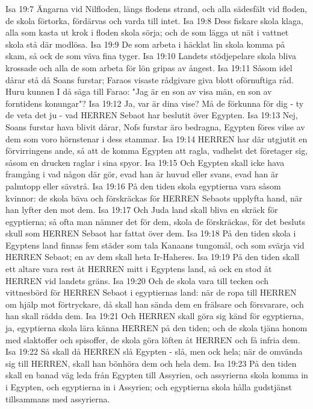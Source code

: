 Isa 19:7  Ängarna vid Nilfloden, längs flodens strand, och alla sädesfält vid floden, de skola förtorka, fördärvas och varda till intet.
Isa 19:8  Dess fiskare skola klaga, alla som kasta ut krok i floden skola sörja; och de som lägga ut nät i vattnet skola stå där modlösa.
Isa 19:9  De som arbeta i häcklat lin skola komma på skam, så ock de som väva fina tyger.
Isa 19:10  Landets stödjepelare skola bliva krossade och alla de som arbeta för lön gripas av ångest.
Isa 19:11  Såsom idel dårar stå då Soans furstar; Faraos visaste rådgivare giva blott oförnuftiga råd. Huru kunnen I då säga till Farao: "Jag är en son av visa män, en son av forntidens konungar"?
Isa 19:12  Ja, var är dina vise? Må de förkunna för dig - ty de veta det ju - vad HERREN Sebaot har beslutit över Egypten.
Isa 19:13  Nej, Soans furstar hava blivit dårar, Nofs furstar äro bedragna, Egypten föres vilse av dem som voro hörnstenar i dess stammar.
Isa 19:14  HERREN har där utgjutit en förvirringens ande, så att de komma Egypten att ragla, vadhelst det företager sig, såsom en drucken raglar i sina spyor.
Isa 19:15  Och Egypten skall icke hava framgång i vad någon där gör, evad han är huvud eller svans, evad han är palmtopp eller sävstrå.
Isa 19:16  På den tiden skola egyptierna vara såsom kvinnor: de skola bäva och förskräckas för HERREN Sebaots upplyfta hand, när han lyfter den mot dem.
Isa 19:17  Och Juda land skall bliva en skräck för egyptierna; så ofta man nämner det för dem, skola de förskräckas, för det besluts skull som HERREN Sebaot har fattat över dem.
Isa 19:18  På den tiden skola i Egyptens land finnas fem städer som tala Kanaans tungomål, och som svärja vid HERREN Sebaot; en av dem skall heta Ir-Haheres.
Isa 19:19  På den tiden skall ett altare vara rest åt HERREN mitt i Egyptens land, så ock en stod åt HERREN vid landets gräns.
Isa 19:20  Och de skola vara till tecken och vittnesbörd för HERREN Sebaot i egyptiernas land: när de ropa till HERREN om hjälp mot förtryckare, då skall han sända dem en frälsare och försvarare, och han skall rädda dem.
Isa 19:21  Och HERREN skall göra sig känd för egyptierna, ja, egyptierna skola lära känna HERREN på den tiden; och de skola tjäna honom med slaktoffer och spisoffer, de skola göra löften åt HERREN och få infria dem.
Isa 19:22  Så skall då HERREN slå Egypten - slå, men ock hela; när de omvända sig till HERREN, skall han bönhöra dem och hela dem.
Isa 19:23  På den tiden skall en banad väg leda från Egypten till Assyrien, och assyrierna skola komma in i Egypten, och egyptierna in i Assyrien; och egyptierna skola hålla gudstjänst tillsammans med assyrierna.
